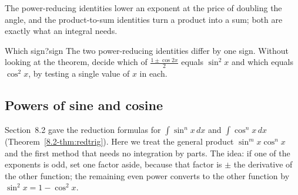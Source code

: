 \documentclass[11pt]{article}
\begin{document}

The power-reducing identities lower an exponent at the price of doubling the angle, and the product-to-sum identities turn a product into a sum; both are exactly what an integral needs.

\begin{think}{Which sign?}{sign}
The two power-reducing identities differ by one sign. Without looking at the theorem, decide which of $\frac{1\pm\cos2x}2$ equals $\sin^2x$ and which equals $\cos^2x$, by testing a single value of $x$ in each.
\end{think}

\subsection*{Powers of sine and cosine}

Section~8.2 gave the reduction formulas for $\int\sin^nx\,dx$ and $\int\cos^nx\,dx$ (Theorem~\ref{8.2-thm:redtrig}). Here we treat the general product $\sin^mx\cos^nx$ and the first method that needs no integration by parts. The idea: if one of the exponents is odd, set one factor aside, because that factor is $\pm$ the derivative of the other function; the remaining even power converts to the other function by $\sin^2x=1-\cos^2x$.
\end{document}
